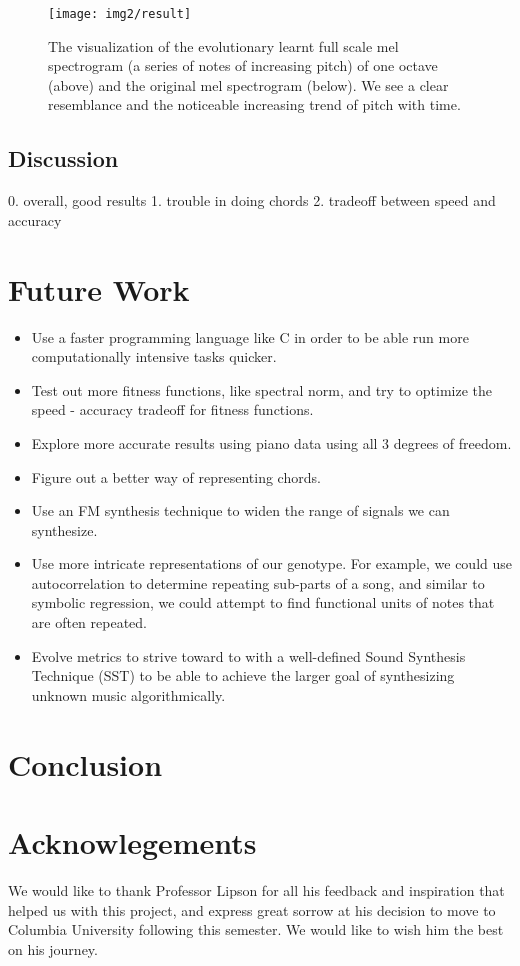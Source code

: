\documentclass{pnastwo}
\begin{document}
\begin{article}
\begin{figure}
\centerline{\texttt{[image: img2/result]}}
\caption{The visualization of the evolutionary learnt full scale mel spectrogram (a series of notes of increasing pitch) of one octave (above) and the original mel spectrogram (below). We see a clear resemblance and the noticeable increasing trend of pitch with time.}\label{fig4}
\end{figure}


\subsection{Discussion}
0. overall, good results
1. trouble in doing chords
2. tradeoff between speed and accuracy
\section{Future Work}
\begin{itemize}
\item Use a faster programming language like C in order to be able run more computationally intensive tasks quicker.
\item Test out more fitness functions, like spectral norm, and try to optimize the speed - accuracy tradeoff for fitness functions.
\item Explore more accurate results using piano data using all 3 degrees of freedom.
\item Figure out a better way of representing chords.
\item Use an FM synthesis technique to widen the range of signals we can synthesize. 
\item Use more intricate representations of our genotype. For example, we could use autocorrelation to determine repeating sub-parts of a song, and similar to symbolic regression, we could attempt to find functional units of notes that are often repeated.  
\item Evolve metrics to strive toward to with a well-defined Sound Synthesis Technique (SST) to be able to achieve the larger goal of synthesizing unknown music algorithmically. 
\end{itemize}
\section{Conclusion}

\section{Acknowlegements}
We would like to thank Professor Lipson for all his feedback and inspiration that helped us with this project, and express great sorrow at his decision to move to Columbia University following this semester. We would like to wish him the best on his journey.


\end{article}
\end{document}
